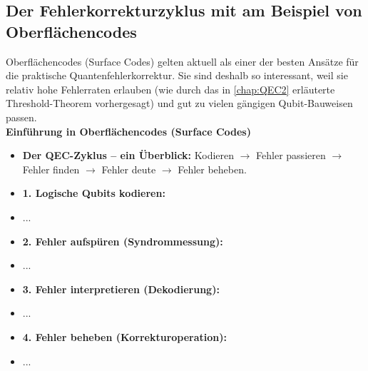 \subsection{Der Fehlerkorrekturzyklus mit am Beispiel von Oberflächencodes}

Oberflächencodes (Surface Codes) gelten aktuell als einer der besten Ansätze für die praktische Quantenfehlerkorrektur. Sie sind deshalb so interessant, weil sie relativ hohe Fehlerraten erlauben (wie durch das in \ref{chap:QEC2} erläuterte Threshold-Theorem vorhergesagt) und gut zu vielen gängigen Qubit-Bauweisen passen.\\

\textbf{Einführung in Oberflächencodes (Surface Codes)}



\begin{itemize}
    \item \textbf{Der QEC-Zyklus -- ein Überblick:} Kodieren $\rightarrow$ Fehler passieren $\rightarrow$ Fehler finden $\rightarrow$ Fehler deute $\rightarrow$ Fehler beheben.
    \item \textbf{1. Logische Qubits kodieren:}
    \item ...
    \item \textbf{2. Fehler aufspüren (Syndrommessung):}
    \item ...
    \item \textbf{3. Fehler interpretieren (Dekodierung):}
    \item ...
    \item \textbf{4. Fehler beheben (Korrekturoperation):}
    \item ...
\end{itemize}

